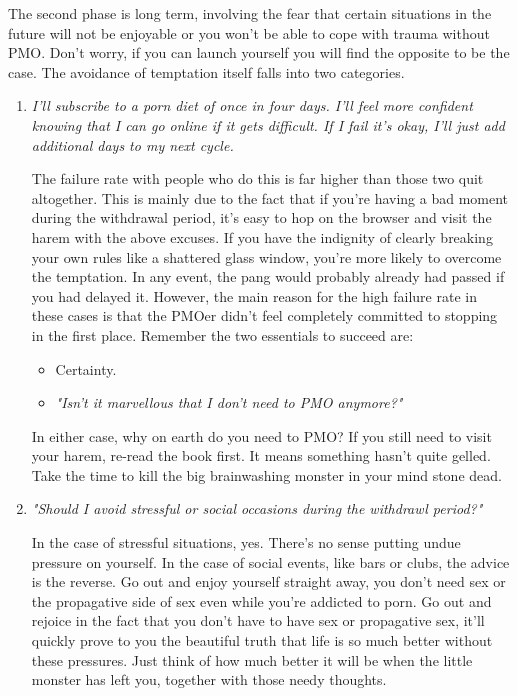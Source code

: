 \documentclass[easypeasy.tex]{subfiles}
\begin{document}
The second phase is long term, involving the fear that certain situations in the future will not be enjoyable or you won't be able to cope with trauma without PMO. Don't worry, if you can launch yourself you will find the opposite to be the case. The avoidance of temptation itself falls into two categories.
  \begin{enumerate}
    \item \textit{I'll subscribe to a porn diet of once in four days. I'll feel more confident knowing that I can go online if it gets difficult. If I fail it's okay, I'll just add additional days to my next cycle.}

The failure rate with people who do this is far higher than those two quit altogether. This is mainly due to the fact that if you're having a bad moment during the withdrawal period, it's easy to hop on the browser and visit the harem with the above excuses. If you have the indignity of clearly breaking your own rules like a shattered glass window, you're more likely to overcome the temptation. In any event, the pang would probably already had passed if you had delayed it. However, the main reason for the high failure rate in these cases is that the PMOer didn't feel completely committed to stopping in the first place. Remember the two essentials to succeed are:

\begin{itemize}
  \item Certainty.
  \item \textit{"Isn't it marvellous that I don't need to PMO anymore?"}
\end{itemize}

In either case, why on earth do you need to PMO? If you still need to visit your harem, re-read the book first. It means something hasn't quite gelled. Take the time to kill the big brainwashing monster in your mind stone dead.

  \item \textit{"Should I avoid stressful or social occasions during the withdrawl period?"}

In the case of stressful situations, yes. There's no sense putting undue pressure on yourself. In the case of social events, like bars or clubs, the advice is the reverse. Go out and enjoy yourself straight away, you don't need sex or the propagative side of sex even while you're addicted to porn. Go out and rejoice in the fact that you don't have to have sex or propagative sex, it'll quickly prove to you the beautiful truth that life is so much better without these pressures. Just think of how much better it will be when the little monster has left you, together with those needy thoughts.
\end{enumerate}
\end{document}
